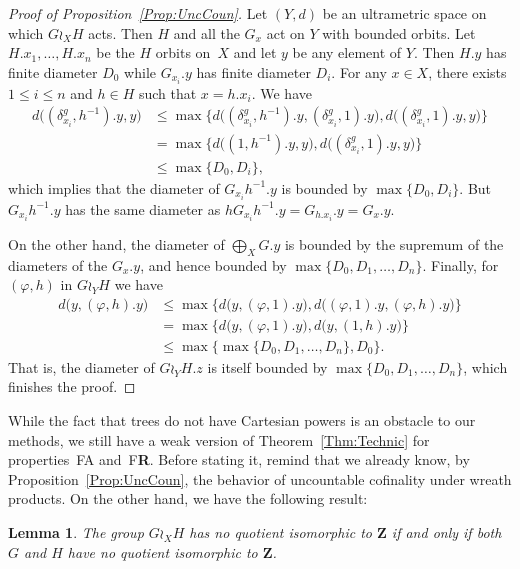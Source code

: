 \documentclass[a4paper]{article}
\newtheorem{lem}{Lemma}[section]
\theoremstyle{definition}
\newcommand*{\field}[1]{\mathbf{#1}}
\newcommand*{\Z}{\field{Z}}
\newcommand*{\FA}{FA}
\newcommand*{\FR}{F\textbf{R}}
\begin{document}
\begin{proof}[Proof of Proposition~\ref{Prop:UncCoun}]
Let $(Y,d)$ be an ultrametric space on which $G\wr_XH$ acts.
Then $H$ and all the $G_x$ act on $Y$ with bounded orbits.
Let $H.x_1,\dots, H.x_n$ be the $H$ orbits on~$X$ and let $y$ be any element of $Y$.
Then $H.y$ has finite diameter $D_0$ while $G_{x_i}.y$ has finite diameter $D_i$.
For any $x\in X$, there exists $1\leq i\leq n$ and $h\in H$ such that $x=h.x_i$.
We have
\begin{align*}
	d\bigl((\delta_{x_i}^g,h^{-1}).y,y\bigr)&\leq\max\{d\bigl((\delta_{x_i}^g,h^{-1}).y,(\delta_{x_i}^g,1).y\bigr),d\bigl((\delta_{x_i}^g,1).y,y\bigr)\}\\
	&=\max\{d\bigl((1,h^{-1}).y,y\bigr),d\bigl((\delta_{x_i}^g,1).y,y\bigr)\}\\
	&\leq \max\{D_0,D_i\},
\end{align*}
which implies that the diameter of $G_{x_i}h^{-1}.y$ is bounded by $\max\{D_0,D_i\}$.
But $G_{x_i}h^{-1}.y$ has the same diameter as $hG_{x_i}h^{-1}.y=G_{h.x_i}.y=G_x.y$.

On the other hand, the diameter of $\bigoplus_XG.y$ is bounded by the supremum of the diameters of the $G_{x}.y$, and hence bounded by $\max\{D_0,D_1,\dots,D_n\}$.
Finally, for $(\varphi,h)$ in $G\wr_YH$ we have
\begin{align*}
	d\bigl(y,(\varphi,h).y\bigr)&\leq\max\{d\bigl(y,(\varphi,1).y\bigr),d\bigl((\varphi,1).y,(\varphi,h).y\bigr)\}\\
	&=\max\{d\bigl(y,(\varphi,1).y\bigr),d\bigl(y,(1,h).y\bigr)\}\\
	&\leq\max\{\max\{D_0,D_1,\dots,D_n\},D_0\}.
\end{align*}
That is, the diameter of $G\wr_YH.z$ is itself bounded by $\max\{D_0,D_1,\dots,D_n\}$, which finishes the proof.
\end{proof}
%
%
While the fact that trees do not have Cartesian powers is an obstacle to our methods, we still have a weak version of Theorem~\ref{Thm:Technic} for properties~\FA{} and~\FR.
Before stating it, remind that we already know, by Proposition~\ref{Prop:UncCoun}, the behavior of uncountable cofinality under wreath products.
On the other hand, we have the following result:
%
%
\begin{lem}\label{Lemma:Z}
The group $G\wr_XH$ has no quotient isomorphic to $\Z$ if and only if both $G$ and $H$ have no quotient isomorphic to $\Z$.
\end{lem}
\end{document}
